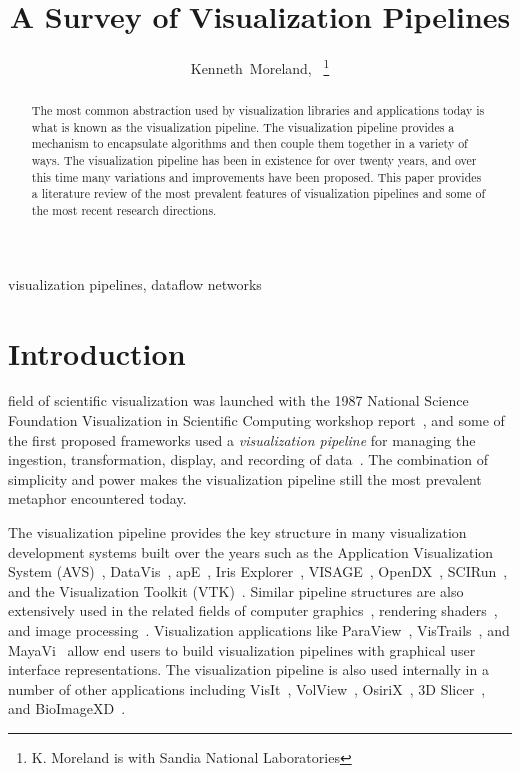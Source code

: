 \documentclass[journal,onecolumn,12pt,letterpaper,twoside]{IEEEtran}
\title{A Survey of Visualization Pipelines}
\author{Kenneth~Moreland,~\IEEEmembership{Member,~IEEE}%
%
\thanks{K. Moreland is with Sandia National Laboratories}
}
\date{}
\newcommand*{\lcite}[1]{~\cite{#1}}
\newcommand*{\keyterm}[1]{\emph{#1}}
\begin{document}
\maketitle


\begin{abstract}
The most common abstraction used by visualization libraries and
applications today is what is known as the visualization pipeline.  The
visualization pipeline provides a mechanism to encapsulate algorithms and
then couple them together in a variety of ways.  The visualization pipeline
has been in existence for over twenty years, and over this time many
variations and improvements have been proposed.  This paper provides a
literature review of the most prevalent features of visualization pipelines
and some of the most recent research directions.
\end{abstract}

\begin{keywords}
  visualization pipelines, dataflow networks
\end{keywords}


\section{Introduction}
\label{sec:Introduction}

 field of scientific visualization was launched with the 1987 National
Science Foundation Visualization in Scientific Computing workshop
report\lcite{ViSC1987}, and some of the first proposed frameworks used a
\keyterm{visualization pipeline} for managing the ingestion,
transformation, display, and recording of
data\lcite{Haeberli1988,Lucas1992}.  The combination of simplicity and
power makes the visualization pipeline still the most prevalent metaphor
encountered today.

The visualization pipeline provides the key structure in many visualization
development systems built over the years such as the Application
Visualization System (AVS)\lcite{AVS}, DataVis\lcite{DataVis},
apE\lcite{apE}, Iris Explorer\lcite{IRISExplorer}, VISAGE\lcite{VISAGE},
OpenDX\lcite{OpenDX}, SCIRun\lcite{SCIRun}, and the Visualization Toolkit
(VTK)\lcite{VTK}.  Similar pipeline structures are also extensively used in
the related fields of computer graphics\lcite{Haeberli1988,Kass1992},
rendering shaders\lcite{Abram1990,Cook1984,Perlin1985}, and image
processing\lcite{Koelma1994,Williams1990,Wilson1989,ITK}.  Visualization
applications like ParaView\lcite{ParaView}, VisTrails\lcite{VisTrails}, and
MayaVi\lcite{MayaVi} allow end users to build visualization pipelines with
graphical user interface representations.  The visualization pipeline is
also used internally in a number of other applications including
VisIt\lcite{VisIt}, VolView\lcite{VolView}, OsiriX\lcite{OsiriX}, 3D
Slicer\lcite{3DSlicer}, and BioImageXD\lcite{BioImageXD}.
\end{document}
